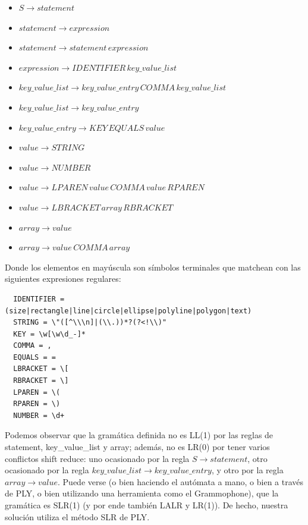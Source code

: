 \documentclass{article}
\theoremstyle{definition}
\theoremstyle{remark}
\begin{document}
\begin{itemize}
  \item $S \rightarrow statement$
  \item $statement \rightarrow expression$
  \item $statement \rightarrow statement\, expression$
  \item $expression \rightarrow IDENTIFIER\, key\_value\_list$
  \item $key\_value\_list \rightarrow key\_value\_entry\, COMMA\, key\_value\_list$
  \item $key\_value\_list \rightarrow key\_value\_entry$
  \item $key\_value\_entry \rightarrow KEY\, EQUALS\, value$
  \item $value \rightarrow STRING$
  \item $value \rightarrow NUMBER$
  \item $value \rightarrow LPAREN\, value\, COMMA\, value\, RPAREN$
  \item $value \rightarrow LBRACKET\, array\, RBRACKET$
  \item $array \rightarrow value$
  \item $array \rightarrow value\, COMMA\, array$
\end{itemize}

Donde los elementos en mayúscula son símbolos terminales que matchean con las siguientes expresiones regulares:

\begin{lstlisting}  
  IDENTIFIER = (size|rectangle|line|circle|ellipse|polyline|polygon|text)
  STRING = \"([^\\\n]|(\\.))*?(?<!\\)"
  KEY = \w[\w\d_-]*
  COMMA = ,
  EQUALS = =
  LBRACKET = \[
  RBRACKET = \]
  LPAREN = \(
  RPAREN = \)
  NUMBER = \d+
\end{lstlisting}

Podemos observar que la gramática definida no es LL(1) por las reglas de statement, key\_value\_list y array; además, no es LR(0) por tener varios conflictos shift reduce: uno ocasionado por la regla $S \rightarrow statement$, otro ocasionado por la regla $key\_value\_list \rightarrow key\_value\_entry$, y otro por la regla $array \rightarrow value$. Puede verse (o bien haciendo el autómata a mano, o bien a través de PLY, o bien utilizando una herramienta como el Grammophone), que la gramática es SLR(1) (y por ende también LALR y LR(1)). De hecho, nuestra solución utiliza el método SLR de PLY.
\end{document}
